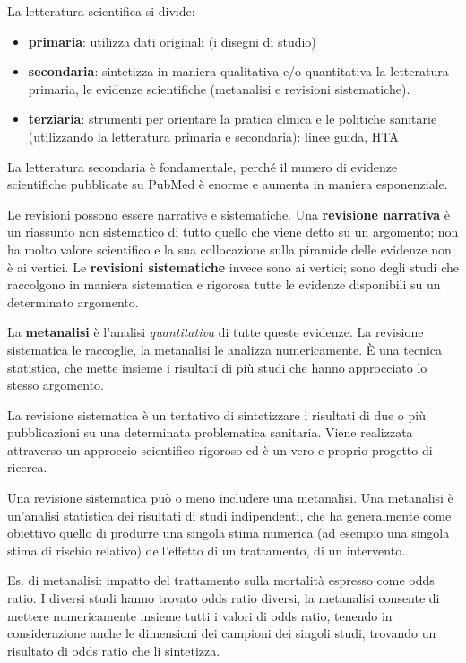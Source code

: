 La letteratura scientifica si divide:

\begin{itemize}
\item
  \textbf{primaria}: utilizza dati originali (i disegni di studio)
\item
  \textbf{secondaria}: sintetizza in maniera qualitativa e/o
  quantitativa la letteratura primaria, le evidenze scientifiche
  (metanalisi e revisioni sistematiche).
\item
  \textbf{terziaria}: strumenti per orientare la pratica clinica e le
  politiche sanitarie (utilizzando la letteratura primaria e
  secondaria): linee guida, HTA
\end{itemize}

La letteratura secondaria è fondamentale, perché il numero di evidenze
scientifiche pubblicate su PubMed è enorme e aumenta in maniera
esponenziale.

Le revisioni possono essere narrative e sistematiche. Una
\textbf{revisione narrativa} è un riassunto non sistematico di tutto
quello che viene detto su un argomento; non ha molto valore scientifico
e la sua collocazione sulla piramide delle evidenze non è ai vertici. Le
\textbf{revisioni sistematiche} invece sono ai vertici; sono degli studi
che raccolgono in maniera sistematica e rigorosa tutte le evidenze
disponibili su un determinato argomento.

La \textbf{metanalisi} è l'analisi \emph{quantitativa} di tutte queste
evidenze. La revisione sistematica le raccoglie, la metanalisi le
analizza numericamente. È una tecnica statistica, che mette insieme i
risultati di più studi che hanno approcciato lo stesso argomento.

La revisione sistematica è un tentativo di sintetizzare i risultati di
due o più pubblicazioni su una determinata problematica sanitaria. Viene
realizzata attraverso un approccio scientifico rigoroso ed è un vero e
proprio progetto di ricerca.

Una revisione sistematica può o meno includere una metanalisi. Una
metanalisi è un'analisi statistica dei risultati di studi indipendenti,
che ha generalmente come obiettivo quello di produrre una singola stima
numerica (ad esempio una singola stima di rischio relativo) dell'effetto
di un trattamento, di un intervento.

Es. di metanalisi: impatto del trattamento sulla mortalità espresso come
odds ratio. I diversi studi hanno trovato odds ratio diversi, la
metanalisi consente di mettere numericamente insieme tutti i valori di
odds ratio, tenendo in considerazione anche le dimensioni dei campioni
dei singoli studi, trovando un risultato di odds ratio che li
sintetizza.

